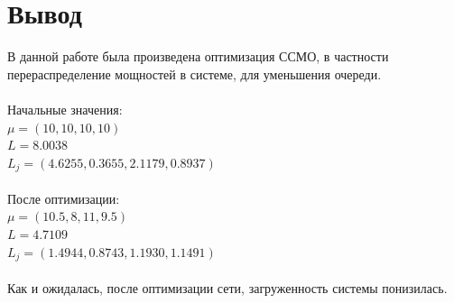 \section{Вывод}
В данной работе была произведена оптимизация ССМО, в частности перераспределение мощностей в системе, для уменьшения очереди.\\\\
Начальные значения:\\
$\mu = (10, 10,10, 10)$\\
$L = 8.0038$\\
$L_j= (4.6255, 0.3655, 2.1179, 0.8937)$\\\\
После оптимизации:\\
$\mu = (10.5, 8, 11, 9.5)$\\
$L = 4.7109$\\
$L_j= (1.4944, 0.8743, 1.1930, 1.1491)$\\\\
Как и ожидалась, после оптимизации сети, загруженность системы понизилась.




%
%

